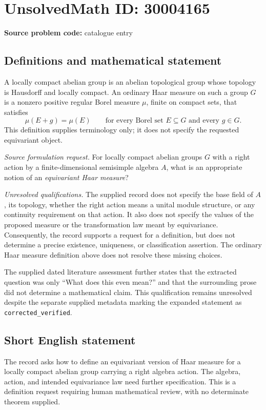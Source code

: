 \documentclass[11pt]{article}
\begin{document}
\section*{UnsolvedMath ID: 30004165}
\textbf{Source problem code:} catalogue entry
\subsection{Definitions and mathematical statement}
A locally compact abelian group is an abelian topological group whose topology is Hausdorff and locally compact. An ordinary Haar measure on such a group \(G\) is a nonzero positive regular Borel measure \(\mu\), finite on compact sets, that satisfies
\[
\mu(E+g)=\mu(E)
\qquad\text{for every Borel set }E\subseteq G\text{ and every }g\in G.
\]
This definition supplies terminology only; it does not specify the requested equivariant object.

\emph{Source formulation request.} For locally compact abelian groups \(G\) with a right action by a finite-dimensional semisimple algebra \(A\), what is an appropriate notion of an \emph{equivariant Haar measure}?

\emph{Unresolved qualifications.} The supplied record does not specify the base field of \(A\), its topology, whether the right action means a unital module structure, or any continuity requirement on that action. It also does not specify the values of the proposed measure or the transformation law meant by equivariance. Consequently, the record supports a request for a definition, but does not determine a precise existence, uniqueness, or classification assertion. The ordinary Haar measure definition above does not resolve these missing choices.

The supplied dated literature assessment further states that the extracted question was only ``What does this even mean?'' and that the surrounding prose did not determine a mathematical claim. This qualification remains unresolved despite the separate supplied metadata marking the expanded statement as \texttt{corrected\_verified}.
\subsection{Short English statement}
The record asks how to define an equivariant version of Haar measure for a locally compact abelian group carrying a right algebra action. The algebra, action, and intended equivariance law need further specification. This is a definition request requiring human mathematical review, with no determinate theorem supplied.
\end{document}
